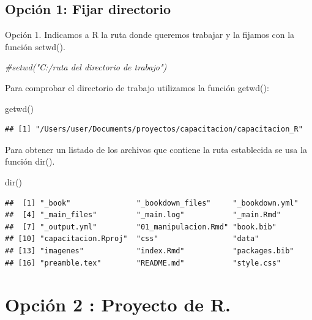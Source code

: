 \documentclass[
]{book}
\newenvironment{Shaded}{\begin{snugshade}}{\end{snugshade}}
\newcommand{\CommentTok}[1]{\textcolor[rgb]{0.56,0.35,0.01}{\textit{#1}}}
\newcommand{\FunctionTok}[1]{\textcolor[rgb]{0.00,0.00,0.00}{#1}}
\newcommand{\NormalTok}[1]{#1}
\begin{document}
\hypertarget{opciuxf3n-1-fijar-directorio}{%
\subsection{Opción 1: Fijar directorio}\label{opciuxf3n-1-fijar-directorio}}

Opción 1. Indicamos a R la ruta donde queremos trabajar y la fijamos con la función setwd().

\begin{Shaded}
\begin{Highlighting}[]
\CommentTok{\#setwd("C:/ruta del directorio de trabajo")}
\end{Highlighting}
\end{Shaded}

Para comprobar el directorio de trabajo utilizamos la función getwd():

\begin{Shaded}
\begin{Highlighting}[]
\FunctionTok{getwd}\NormalTok{()}
\end{Highlighting}
\end{Shaded}

\begin{verbatim}
## [1] "/Users/user/Documents/proyectos/capacitacion/capacitacion_R"
\end{verbatim}

Para obtener un listado de los archivos que contiene la ruta establecida se usa la función dir().

\begin{Shaded}
\begin{Highlighting}[]
\FunctionTok{dir}\NormalTok{()}
\end{Highlighting}
\end{Shaded}

\begin{verbatim}
##  [1] "_book"               "_bookdown_files"     "_bookdown.yml"      
##  [4] "_main_files"         "_main.log"           "_main.Rmd"          
##  [7] "_output.yml"         "01_manipulacion.Rmd" "book.bib"           
## [10] "capacitacion.Rproj"  "css"                 "data"               
## [13] "imagenes"            "index.Rmd"           "packages.bib"       
## [16] "preamble.tex"        "README.md"           "style.css"
\end{verbatim}

\hypertarget{opciuxf3n-2-proyecto-de-r.}{%
\section{Opción 2 : Proyecto de R.}\label{opciuxf3n-2-proyecto-de-r.}}
\end{document}
